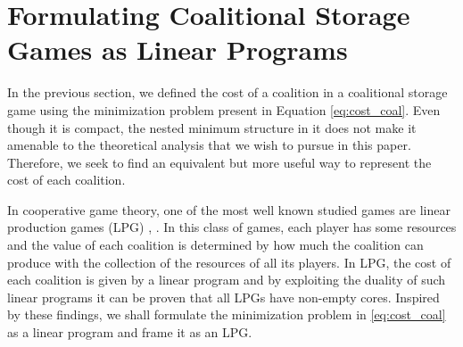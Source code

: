 \documentclass[sigconf, table]{acmart}
\begin{document}

\section{Formulating Coalitional Storage Games as Linear Programs}

In the previous section, we defined the cost of a coalition in a coalitional storage game using the minimization problem present in Equation \eqref{eq:cost_coal}. Even though it is compact, the nested minimum structure in it does not make it amenable to the theoretical analysis that we wish to pursue in this paper. Therefore, we seek to find an equivalent but more useful way to represent the cost of each coalition.

In cooperative game theory, one of the most well known studied games are linear production games (LPG) \cite{Borm2001}, \cite{Owen1975}. In this class of games, each player has some resources and the value of each coalition is determined by how much the coalition can produce with the collection of the resources of all its players.
In LPG, the cost of each coalition is given by a linear program and by exploiting the duality of such linear programs it can be proven that all LPGs have non-empty cores. 
Inspired by these findings, we shall formulate the minimization problem in \eqref{eq:cost_coal} as a linear program and frame it as an LPG.





\end{document}
